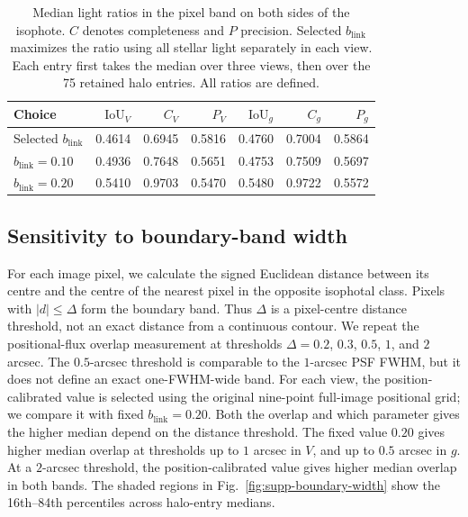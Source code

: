 \documentclass[usenatbib]{mnras}
\begin{document}
\begin{table}
\centering
\caption{Median light ratios in the pixel band on both sides of the
isophote. $C$ denotes completeness and $P$ precision.
Selected $b_{\mathrm{link}}$ maximizes the ratio using all stellar light separately
in each view. Each entry first takes the median over three views,
then over the 75 retained halo entries. All ratios are defined.}
\label{tab:ring}
\small
\setlength{\tabcolsep}{2.5pt}
\begin{tabular}{lrrrrrr}
\toprule
Choice & $\mathrm{IoU}_{V}$ & $C_{V}$ & $P_{V}$ & $\mathrm{IoU}_{g}$ & $C_{g}$ & $P_{g}$ \\
\midrule
Selected $b_{\mathrm{link}}$ & 0.4614 & 0.6945 & 0.5816 & 0.4760 & 0.7004 & 0.5864 \\
$b_{\mathrm{link}}=0.10$ & 0.4936 & 0.7648 & 0.5651 & 0.4753 & 0.7509 & 0.5697 \\
$b_{\mathrm{link}}=0.20$ & 0.5410 & 0.9703 & 0.5470 & 0.5480 & 0.9722 & 0.5572 \\
\bottomrule
\end{tabular}
\end{table}

\subsection{Sensitivity to boundary-band width}
\label{supp:boundary-width}

For each image pixel, we calculate the signed Euclidean distance between
its centre and the centre of the nearest pixel in the opposite isophotal
class. Pixels with $|d|\leq\Delta$ form the boundary band. Thus $\Delta$
is a pixel-centre distance threshold, not an exact distance from a
continuous contour. We repeat the positional-flux overlap measurement at
thresholds $\Delta=0.2$, $0.3$, $0.5$, $1$, and $2$ arcsec. The $0.5$-arcsec
threshold is comparable to the $1$-arcsec PSF FWHM, but it does not define
an exact one-FWHM-wide band. For each view, the position-calibrated value
is selected using the original nine-point full-image positional grid; we
compare it with fixed $b_{\mathrm{link}}=0.20$. Both the overlap and which
parameter gives the higher median depend on the distance threshold. The
fixed value $0.20$ gives higher median overlap at thresholds up to $1$ arcsec
in $V$, and up to $0.5$ arcsec in $g$. At a $2$-arcsec threshold, the
position-calibrated value gives higher median overlap in both bands. The shaded regions in
Fig.~\ref{fig:supp-boundary-width} show the 16th--84th percentiles across
halo-entry medians.
\end{document}
